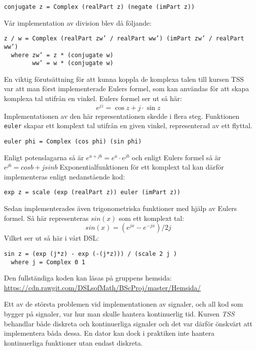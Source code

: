 \documentclass[]{article}
\begin{document}
\begin{verbatim}
conjugate z = Complex (realPart z) (negate (imPart z))
\end{verbatim}
Vår implementation av division blev då följande:
\begin{verbatim}
z / w = Complex (realPart zw’ / realPart ww’) (imPart zw’ / realPart ww’)
  where zw’ = z * (conjugate w)
        ww’ = w * (conjugate w)
\end{verbatim}

En viktig förutsättning för att kunna koppla de komplexa talen till kursen TSS var att man först 
implementerade Eulers formel, som kan användas för att skapa komplexa tal utifrån en vinkel. Eulers 
formel ser ut så här:
\[e^{jz}=\cos z+ j \cdot \sin z \]
Implementationen av den här representationen skedde i flera steg.
Funktionen \texttt{euler} skapar ett komplext tal utifrån en
given vinkel, representerad av ett flyttal.
\begin{verbatim}
euler phi = Complex (cos phi) (sin phi)
\end{verbatim}
Enligt potenslagarna%
så är \(e^{a+jb} = e^{a} \cdot e^{jb}\) och enligt Eulers formel så är
\(e^{j b} = cos b + j\dot sin b\) Exponentialfunktionen för ett komplext tal kan 
därför implementeras enligt nedanstående kod:

\begin{verbatim}
exp z = scale (exp (realPart z)) euler (imPart z))
\end{verbatim}
Sedan implementerades även trigonometriska funktioner med hjälp av Eulers
formel. Så här representeras $sin(x)$ som ett komplext tal:
\[ sin(x) = (e^{j x} - e^{-j x}) / 2 j \]
Vilket ser ut så här i vårt DSL:
\begin{verbatim}
sin z = (exp (j*z) - exp (-(j*z))) / (scale 2 j )
  where j = Complex 0 1
\end{verbatim}

Den fullständiga koden kan läsas på gruppens hemsida:
\url{https://cdn.rawgit.com/DSLsofMath/BScProj/master/Hemsida/}

Ett av de största problemen vid implementationen av signaler, och all kod som bygger på signaler, var hur man 
skulle hantera kontinuerlig tid. Kursen \textit{TSS} behandlar både diskreta och kontinuerliga signaler och det var 
därför önskvärt att implementera båda dessa. En dator kan dock i praktiken inte hantera kontinuerliga funktioner utan 
endast diskreta. 
\end{document}
